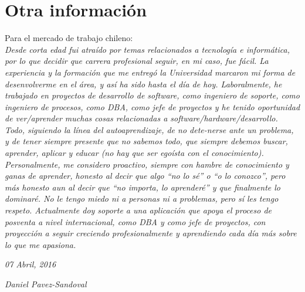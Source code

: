 \documentclass[]{friggeri-cv}
\begin{document}
\section{Otra informaci{\'o}n}
Para el mercado de trabajo chileno:\\
\emph{Desde corta edad fui atraído por temas relacionados a tecnología e informática, por lo que decidir que carrera profesional seguir, en mi caso, fue fácil. La experiencia y la formación que me entregó la Universidad marcaron mi forma de desenvolverme en el área, y así ha sido hasta el día de hoy. Laboralmente, he trabajado en proyectos de desarrollo de software, como ingeniero de soporte, como ingeniero de procesos, como DBA, como jefe de proyectos y he tenido oportunidad de ver/aprender muchas cosas relacionadas a software/hardware/desarrollo. Todo, siguiendo la línea del autoaprendizaje, de no dete-nerse ante un problema, y de tener siempre presente que no sabemos todo, que siempre debemos buscar, aprender, aplicar y educar (no hay que ser egoísta con el conocimiento). Personalmente, me considero proactivo, siempre con hambre de conocimiento y ganas de aprender, honesto al decir que algo ``no lo sé'' o ``o lo conozco'', pero más honesto aun al decir que ``no importa, lo aprenderé'' y que finalmente lo dominaré. No le tengo miedo ni a personas ni a problemas, pero sí les tengo respeto. Actualmente doy soporte a una aplicación que apoya el proceso de posventa a nivel internacional, como DBA y como jefe de proyectos, con proyección a seguir creciendo profesionalmente y aprendiendo cada día más sobre lo que me apasiona.}
\\
\begin{flushleft}
\emph{07 Abril, 2016}
\end{flushleft}
\begin{flushright}
\emph{Daniel Pavez-Sandoval}
\end{flushright}

% 
\end{document}
